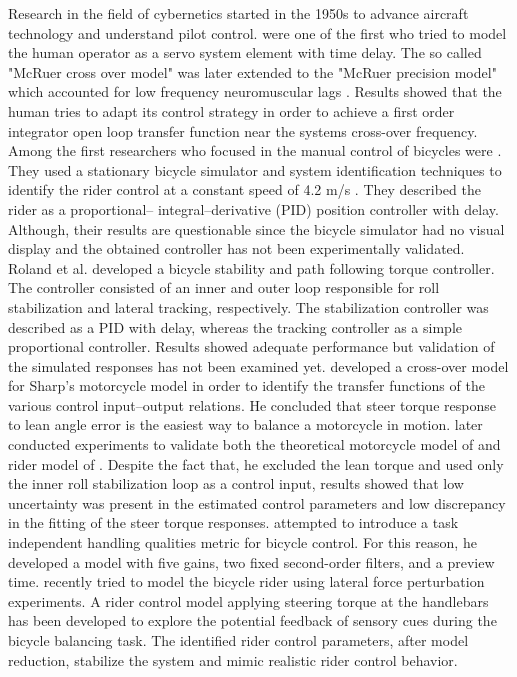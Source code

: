 Research in the field of cybernetics started in the 1950s to advance aircraft technology and understand pilot control. \citet{mcruer1959human} were one of the first who tried to model the human operator as a servo system element with  time delay. The so called "McRuer cross over model" was later extended to the "McRuer precision model" which accounted for low frequency neuromuscular lags \cite{mcruer1967manual}.  Results showed that the human tries to adapt its control strategy in order to achieve a first order integrator open loop transfer function  near the systems cross-over frequency. Among the first researchers who focused in the manual control of bicycles were \citet{van1970influence}. They used a stationary bicycle simulator and system identification techniques to identify the rider control at a constant speed of 4.2 m/s . They described the rider as a proportional– integral–derivative (PID) position controller with delay. Although, their results are questionable since the bicycle simulator had no visual display and the obtained controller has not been experimentally validated. Roland et al. \cite{roland1971massing, roland1973computer} developed a bicycle stability and path following torque controller. The controller consisted of an inner and outer loop responsible for roll stabilization and lateral tracking, respectively. The stabilization controller was described as a PID with delay, whereas the tracking controller as a simple proportional controller. Results showed adequate performance but validation of the simulated responses has not been examined yet. \citet{weir1973manual} developed a cross-over model for Sharp's  \cite{sharp1971stability} motorcycle model in order to identify the transfer functions of the various control input–output relations. He concluded that steer torque response to lean angle error is the easiest way to balance a motorcycle in motion. \citet{eaton1975man} later conducted experiments to validate both the theoretical motorcycle model of  \citet{sharp1971stability} and rider model of \citet{weir1973manual} . Despite the fact that, he excluded the lean torque and used only the inner roll stabilization loop as a control input, results showed that low uncertainty was present in the estimated control parameters and low discrepancy in the fitting of the steer torque responses. \citet{hess2012modeling} attempted to introduce a task independent handling qualities metric for bicycle control. For this reason, he developed a model with five gains, two fixed second-order filters, and a preview time. \citet{schwab2013} recently tried to model the bicycle rider using lateral force perturbation experiments. A rider control model applying steering torque at the handlebars has been developed to explore the potential feedback of sensory cues during the bicycle balancing task. The identified rider control parameters, after model reduction, stabilize the system and mimic realistic rider control behavior.

